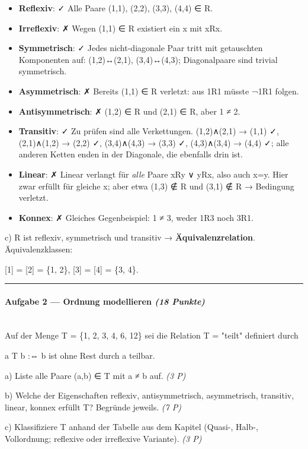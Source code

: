\documentclass[11pt, a4paper]{article}
\begin{document}
\begin{itemize}
  \item \textbf{Reflexiv}: ✓ Alle Paare (1,1), (2,2), (3,3), (4,4) ∈ R.
  \item \textbf{Irreflexiv}: ✗ Wegen (1,1) ∈ R existiert ein x mit xRx.
  \item \textbf{Symmetrisch}: ✓ Jedes nicht-diagonale Paar tritt mit getauschten Komponenten auf: (1,2)↔(2,1), (3,4)↔(4,3); Diagonalpaare sind trivial symmetrisch.
  \item \textbf{Asymmetrisch}: ✗ Bereits (1,1) ∈ R verletzt: aus 1R1 müsste ¬1R1 folgen.
  \item \textbf{Antisymmetrisch}: ✗ (1,2) ∈ R und (2,1) ∈ R, aber 1 ≠ 2.
  \item \textbf{Transitiv}: ✓ Zu prüfen sind alle Verkettungen. (1,2)∧(2,1) → (1,1) ✓, (2,1)∧(1,2) → (2,2) ✓, (3,4)∧(4,3) → (3,3) ✓, (4,3)∧(3,4) → (4,4) ✓; alle anderen Ketten enden in der Diagonale, die ebenfalls drin ist.
  \item \textbf{Linear}: ✗ Linear verlangt für \textit{alle} Paare xRy ∨ yRx, also auch x=y. Hier zwar erfüllt für gleiche x; aber etwa (1,3) ∉ R und (3,1) ∉ R → Bedingung verletzt.
  \item \textbf{Konnex}: ✗ Gleiches Gegenbeispiel: 1 ≠ 3, weder 1R3 noch 3R1.
\end{itemize}

c) R ist reflexiv, symmetrisch und transitiv → \textbf{Äquivalenzrelation}. Äquivalenzklassen:

[1] = [2] = \{1, 2\}, [3] = [4] = \{3, 4\}.



\noindent\textcolor{rulegray}{\rule{\linewidth}{0.4pt}}


\paragraph{Aufgabe 2 — Ordnung modellieren \textit{(18 Punkte)}}\mbox{}\\[2pt]

Auf der Menge T = \{1, 2, 3, 4, 6, 12\} sei die Relation T = "teilt" definiert durch

a T b :⇔ b ist ohne Rest durch a teilbar.


a) Liste alle Paare (a,b) ∈ T mit a ≠ b auf. \textit{(3 P)}

b) Welche der Eigenschaften reflexiv, antisymmetrisch, asymmetrisch, transitiv, linear, konnex erfüllt T? Begründe jeweils. \textit{(7 P)}

c) Klassifiziere T anhand der Tabelle aus dem Kapitel (Quasi-, Halb-, Vollordnung; reflexive oder irreflexive Variante). \textit{(3 P)}
\end{document}
